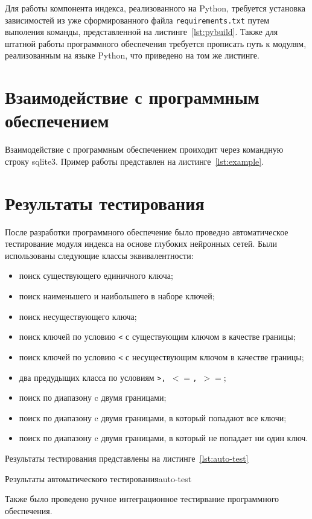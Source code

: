 %
Для работы компонента индекса, реализованного на Python, требуется установка
зависимостей из уже сформированного файла \texttt{requirements.txt} путем
выполения команды, представленной на листинге~\ref{lst:pybuild}. Также для
штатной работы программного обеспечения требуется прописать путь к модулям,
реализованным на языке Python, что приведено на том же листинге.


\section{Взаимодействие с программным обеспечением}

Взаимодействие с программным обеспечением проиходит через командную строку
sqlite3. Пример работы представлен на листинге~\ref{lst:example}.


\section{Результаты тестирования}

После разработки программного обеспечение было проведно автоматическое
тестирование модуля индекса на основе глубоких нейронных сетей. Были
использованы следующие классы эквивалентности:

\begin{itemize}
    \item поиск существующего единичного ключа;
    \item поиск наименьшего и наибольшего в наборе ключей;
    \item поиск несуществующего ключа;
    \item поиск ключей по условию \texttt{<} с существующим ключом в качестве
        границы;
    \item поиск ключей по условию \texttt{<} с несуществующим ключом в качестве
        границы;
    \item два предудыщих класса по условиям \texttt{>, $<=$, $>=$};
    \item поиск по диапазону c двумя границами;
    \item поиск по диапазону c двумя границами, в который попадают все ключи;
    \item поиск по диапазону c двумя границами, в который не попадает ни один
        ключ.
\end{itemize}

Результаты тестирования представлены на листинге~\ref{lst:auto-test}

{}{Результаты автоматического тестирования}{auto-test}{}



Также было проведено ручное интеграционное тестирвание программного обеспечения.

